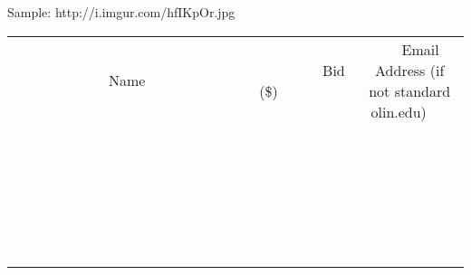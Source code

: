 \documentclass[11pt]{article}
\begin{document}
Sample:
http://i.imgur.com/hfIKpOr.jpg
\\[6ex]
\begin{tabular}{c c c}
~~~~~~~~~~~~~Name~~~~~~~~~~~~~ & ~~~~~~~~~Bid (\$)~~~~~~~~~  & ~~~Email Address (if not standard olin.edu)~~~\\
 & & \\
\hline
 & & \\
\hline
 & & \\
\hline
 & & \\
\hline
 & & \\
\hline
 & & \\
\hline
 & & \\
\hline
 & & \\
\hline
 & & \\
\hline
 & & \\
\hline
 & & \\
\hline
 & & \\
\hline
 & & \\
\hline
 & & \\
\hline
 & & \\
\hline
 & & \\
\hline
 & & \\
\hline
 & & \\
\hline
 & & \\
\hline
 & & \\
\hline
 & & \\
\hline
 & & \\
\hline
 & & \\
\hline
 & & \\
\hline
 & & \\
\hline
 & & \\
\hline
\end{tabular}
\newpage
\end{document}
